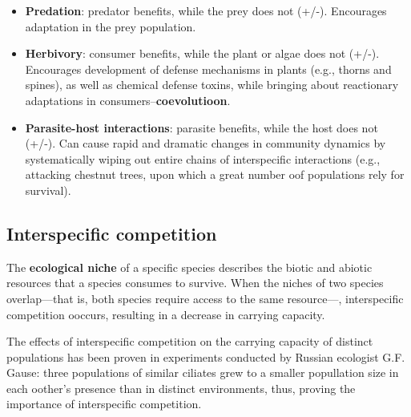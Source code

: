 \message{ !name(chapter_37.tex)}\documentclass{article}
\begin{document}
\begin{itemize}
	\item \textbf{Predation}: predator benefits, while the prey does not (+/-). Encourages adaptation in the
	prey population.
	\item \textbf{Herbivory}: consumer benefits, while the plant or algae does not (+/-). Encourages
	development of defense mechanisms in plants (e.g., thorns and spines), as well as chemical defense toxins,
	while bringing about reactionary adaptations in consumers--\textbf{coevolutioon}.
	\item \textbf{Parasite-host interactions}: parasite benefits, while the host does not (+/-). Can cause
	rapid and dramatic changes in community dynamics by systematically wiping out entire chains of
	interspecific interactions (e.g., attacking chestnut trees, upon which a great number oof populations
	rely for survival).
\end{itemize}

\subsection{Interspecific competition}

The \textbf{ecological niche} of a specific species describes the biotic and abiotic resources that a species
consumes to survive. When the niches of two species overlap---that is, both species require access to the same
resource---, interspecific competition ooccurs, resulting in a decrease in carrying capacity.

The effects of interspecific competition on the carrying capacity of distinct populations has been proven in
experiments conducted by Russian ecologist G.F. Gause: three populations of similar ciliates grew to a smaller
popullation size in each oother's presence than in distinct environments, thus, proving the importance of
interspecific competition.
\end{document}
